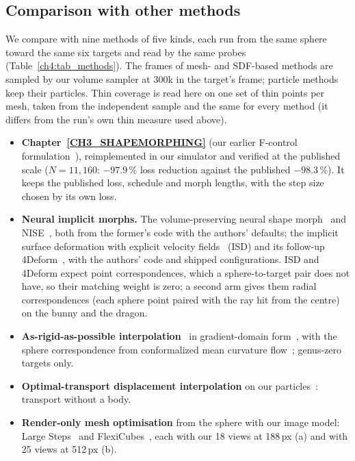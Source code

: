 \subsection{Comparison with other methods}
\label{ch4:sec_comparison}
We compare with nine methods of five kinds, each run from the same sphere toward the same six targets and read by the
same probes (Table~\ref{ch4:tab_methods}). The frames of mesh- and SDF-based methods are sampled by our volume sampler
at 300k in the target's frame; particle methods keep their particles. Thin coverage is read here on one set of thin
points per mesh, taken from the independent sample and the same for every method (it differs from the run's own thin
measure used above).
\begin{itemize}
  \item \textbf{Chapter~\ref{CH3_SHAPEMORPHING}} (our earlier F-control formulation~\citep{11088224}), reimplemented in our
        simulator and verified at the published scale ($N=11{,}160$: $-97.9$\,\% loss reduction against the published
        $-98.3$\,\%). It keeps the published loss, schedule and morph lengths, with the step size chosen by its own loss.
  \item \textbf{Neural implicit morphs.} The volume-preserving neural shape morph~\citep{buonomo2025vpnsm} and
        NISE~\citep{novello2023nise}, both from the former's code with the authors' defaults; the implicit surface
        deformation with explicit velocity fields~\citep{sang2025isd} (ISD) and its follow-up 4Deform~\citep{sang2025fourdeform},
        with the authors' code and shipped configurations. ISD and 4Deform expect point correspondences, which a
        sphere-to-target pair does not have, so their matching weight is zero; a second arm gives them radial
        correspondences (each sphere point paired with the ray hit from the centre) on the bunny and the dragon.
  \item \textbf{As-rigid-as-possible interpolation}~\citep{alexa2000arap} in gradient-domain
        form~\citep{sumner2004deftransfer,xu2005poisson}, with the sphere correspondence from conformalized mean curvature
        flow~\citep{kazhdan2012cmcf}; genus-zero targets only.
  \item \textbf{Optimal-transport displacement interpolation} on our particles~\citep{mccann1997convexity,bonneel2011displacement}:
        transport without a body.
  \item \textbf{Render-only mesh optimisation} from the sphere with our image model: Large
        Steps~\citep{nicolet2021largesteps} and FlexiCubes~\citep{shen2023flexicubes}, each with our 18 views at 188\,px
        (a) and with 25 views at 512\,px (b).
\end{itemize}

